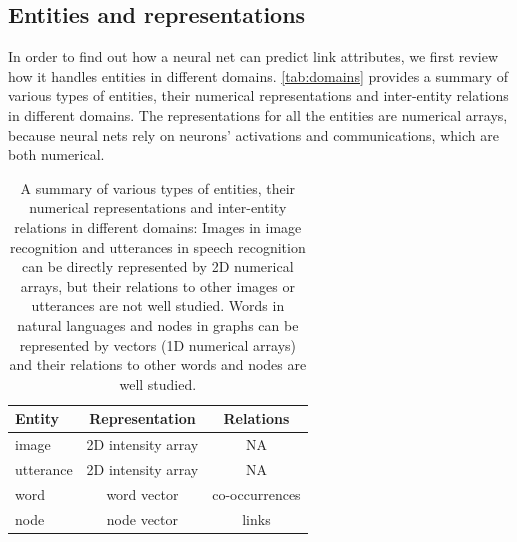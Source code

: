 \documentclass[twocolumn]{article}
\begin{document}
\subsection{Entities and representations}
In order to find out how a neural net can predict link attributes, we first 
review how it handles entities in different domains.
\autoref{tab:domains} provides a summary of various types of entities, their 
numerical representations and inter-entity relations in different domains.
The representations for all the entities are numerical arrays, 
because neural nets rely on neurons' activations and communications, which 
are both numerical.
\begin{table}[h]
	\centering
	\caption{A summary of various types of entities, their numerical
		representations and inter-entity relations in different domains:
		Images in image recognition and utterances in speech recognition can be 
		directly represented by 2D numerical arrays, 
		but their relations to other images or utterances are not well studied. 
		Words in natural languages and nodes in graphs can be represented by 
		vectors (1D numerical arrays) and their relations to other words and 
		nodes are well studied.}
	\begin{tabularx}{0.5\textwidth}{|X|c|c| }  \hline
 \textbf{Entity} & \textbf{Representation} & \textbf{Relations} \\ \hline
	 image & 2D intensity array & NA \\ \hline
	 utterance & 2D intensity array & NA \\ \hline
	 word & word vector & co-occurrences \\ \hline
	 node & node vector & links \\ \hline
	\end{tabularx}
	\label{tab:domains}
\end{table}
\end{document}
